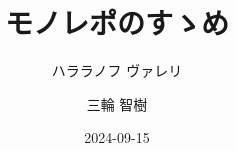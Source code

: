 \documentclass{beamer}
\title{モノレポのすゝめ}
\author{ハララノフ ヴァレリ \and 三輪 智樹}
\institute{個人\\情報科学若手の会}
\date{2024-09-15} %
\begin{document}
\frame{\titlepage}








\end{document}
